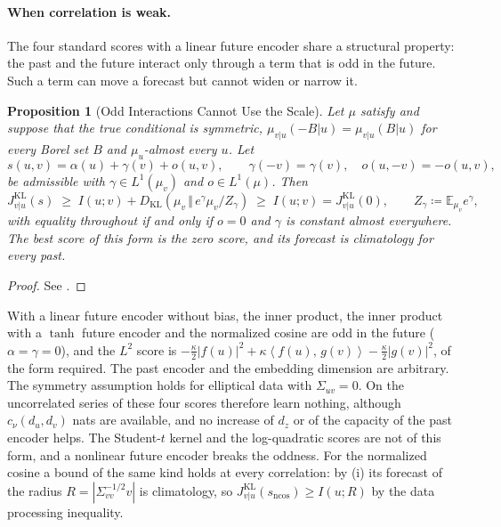 \documentclass[11pt]{article}
\theoremstyle{plain}
\newtheorem{proposition}[theorem]{Proposition}
\theoremstyle{definition}
\theoremstyle{remark}
\newcommand{\E}{\mathbb{E}}
\newcommand{\define}{\coloneqq}
\newcommand{\KL}[2]{D_{\mathrm{KL}}\!\left(#1\,\Vert\,#2\right)}
\newcommand{\IP}[2]{\left\langle #1,\, #2 \right\rangle}
\newcommand{\abs}[1]{\left\lvert #1 \right\rvert}
\newcommand{\sncos}{s_{\mathrm{ncos}}}
\newcommand{\Jvu}{J_{v\vert u}}
\begin{document}
\paragraph{When correlation is weak.}
The four standard scores with a linear future encoder share a structural
property: the past and the future interact only through a term that is odd
in the future. Such a term can move a forecast but cannot widen or narrow it.

\begin{proposition}[Odd Interactions Cannot Use the Scale]
 \label{prop:odd}
 Let $\mu$ satisfy  and suppose that the true conditional is
 symmetric, $\mu_{v\vert u}(-B\vert u)=\mu_{v\vert u}(B\vert u)$ for every
 Borel set $B$ and $\mu_u$-almost every $u$. Let
 \begin{equation*}
  s(u,v)=\alpha(u)+\gamma(v)+o(u,v),\qquad\gamma(-v)=\gamma(v),\quad o(u,-v)=-o(u,v),
 \end{equation*}
 be admissible with $\gamma\in L^{1}(\mu_v)$ and $o\in L^{1}(\mu)$. Then
 \begin{equation*}
  \Jvu^{\mathrm{KL}}(s)\;\ge\;I(u;v)+\KL{\mu_v}{e^{\gamma}\mu_v/Z_\gamma}\;\ge\;I(u;v)=\Jvu^{\mathrm{KL}}(0),
  \qquad Z_\gamma\define\E_{\mu_v}e^{\gamma},
 \end{equation*}
 with equality throughout if and only if $o=0$ and $\gamma$ is constant
 almost everywhere. The best score of this form is the zero score, and its
 forecast is climatology for every past.
\end{proposition}
\begin{proof}
 See .
\end{proof}

With a linear future encoder without bias, the inner product, the inner
product with a $\tanh$ future encoder and the normalized cosine are odd in
the future ($\alpha=\gamma=0$), and the $L^2$ score is
$-\tfrac\kappa2\abs{f(u)}^{2}+\kappa\IP{f(u)}{g(v)}-\tfrac\kappa2\abs{g(v)}^{2}$,
of the form required. The past encoder and the embedding dimension are
arbitrary. The symmetry assumption holds for elliptical data with
$\Sigma_{uv}=0$. On the uncorrelated series of  these four
scores therefore learn nothing, although $c_\nu(d_u,d_v)$ nats are available,
and no increase of $d_z$ or of the capacity of the past encoder helps. The
Student-$t$ kernel and the log-quadratic scores are not of this form, and a
nonlinear future encoder breaks the oddness. For the normalized cosine a
bound of the same kind holds at every correlation: by
(i) its forecast of the radius
$R=\abs{\Sigma_{vv}^{-1/2}v}$ is climatology, so
$\Jvu^{\mathrm{KL}}(\sncos)\ge I(u;R)$ by the data processing inequality.
\end{document}
